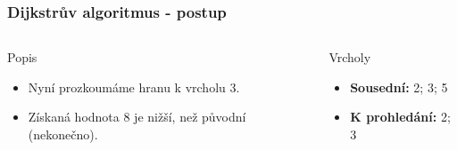 \documentclass{beamer}
\begin{document}
\begin{frame}
    \frametitle{Dijkstrův algoritmus - postup}
    \begin{columns}
        \begin{block}{Popis}
            \begin{itemize}
                \item Nyní prozkoumáme hranu k vrcholu 3.
                \item Získaná hodnota 8 je nižší, než původní (nekonečno).
            \end{itemize}
        \end{block}
        \begin{block}{Vrcholy}
            \begin{itemize}
                \item \textbf{Sousední:} 2; 3; 5 
                \item \textbf{K prohledání:} 2; 3
            \end{itemize}
        \end{block}
    \end{columns}
\end{frame}
\end{document}
